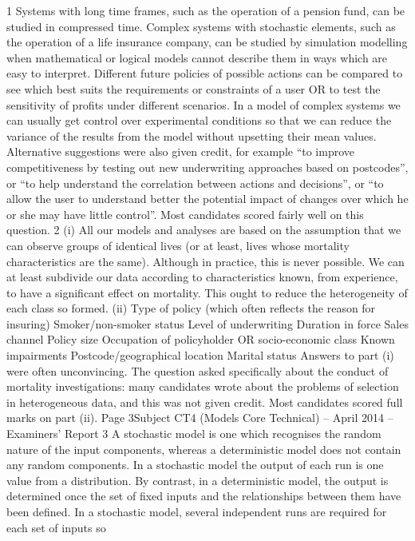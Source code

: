 \documentclass[a4paper,12pt]{article}
\begin{document}
\begin{enumerate}
1
Systems with long time frames, such as the operation of a pension fund, can be
studied in compressed time.
Complex systems with stochastic elements, such as the operation of a life insurance
company, can be studied by simulation modelling when mathematical or logical
models cannot describe them in ways which are easy to interpret.
Different future policies of possible actions can be compared to see which best suits
the requirements or constraints of a user OR to test the sensitivity of profits under
different scenarios.
In a model of complex systems we can usually get control over experimental
conditions so that we can reduce the variance of the results from the model without
upsetting their mean values.
Alternative suggestions were also given credit, for example “to improve competitiveness by
testing out new underwriting approaches based on postcodes”, or “to help understand the
correlation between actions and decisions”, or “to allow the user to understand better the
potential impact of changes over which he or she may have little control”. Most candidates
scored fairly well on this question.
2
(i)
All our models and analyses are based on the assumption that we can observe
groups of identical lives (or at least, lives whose mortality characteristics are
the same).
Although in practice, this is never possible.
We can at least subdivide our data according to characteristics known, from
experience, to have a significant effect on mortality.
This ought to reduce the heterogeneity of each class so formed.
(ii)
Type of policy (which often reflects the reason for insuring)
Smoker/non-smoker status
Level of underwriting
Duration in force
Sales channel
Policy size
Occupation of policyholder OR socio-economic class
Known impairments
Postcode/geographical location
Marital status
Answers to part (i) were often unconvincing. The question asked specifically about the
conduct of mortality investigations: many candidates wrote about the problems of selection in
heterogeneous data, and this was not given credit. Most candidates scored full marks on
part (ii).
Page 3Subject CT4 (Models Core Technical) – April 2014 – Examiners’ Report
3
A stochastic model is one which recognises the random nature of the input
components, whereas a deterministic model does not contain any random
components.
In a stochastic model the output of each run is one value from a distribution. By
contrast, in a deterministic model, the output is determined once the set of fixed inputs
and the relationships between them have been defined.
In a stochastic model, several independent runs are required for each set of inputs so

\end{enumerate}
\end{document}
